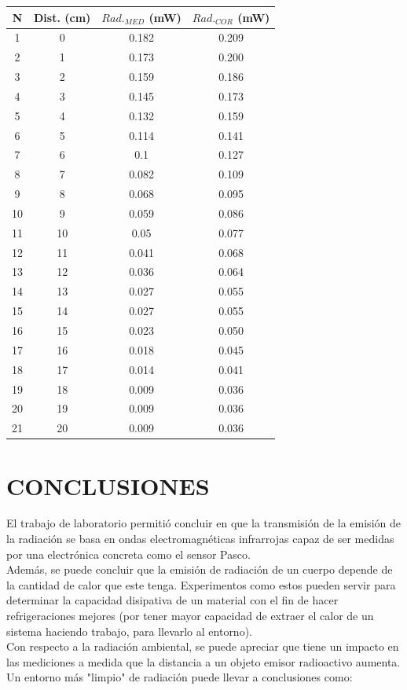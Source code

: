 \documentclass[a4paper]{article}
\begin{document}
		\begin{tabular}{ c  c  c  c }
			\toprule
			N \textdegree & Dist. (cm) & $Rad._{MED}$ (mW) & $Rad._{COR}$ (mW) \\
			\midrule
			1   &   0   & 0.182   & 0.209 \\
			2   &   1   & 0.173   & 0.200 \\
			3   &   2   & 0.159   & 0.186 \\
			4   &   3   & 0.145   & 0.173 \\
			5   &   4   & 0.132   & 0.159 \\
			6   &   5   & 0.114   & 0.141 \\
			7   &   6   & 0.1  	  & 0.127 \\
			8   &   7   & 0.082   & 0.109 \\
			9   &   8   & 0.068   & 0.095 \\
			10  &   9   & 0.059   & 0.086 \\
			11  &   10  & 0.05    & 0.077 \\
			12  &   11  & 0.041   & 0.068 \\
			13  &   12  & 0.036   & 0.064 \\
			14  &   13  & 0.027   & 0.055 \\
			15  &   14  & 0.027   & 0.055 \\
			16  &   15  & 0.023   & 0.050 \\
			17  &   16  & 0.018   & 0.045 \\
			18  &   17  & 0.014   & 0.041 \\
			19  &   18  & 0.009   & 0.036 \\
			20  &   19  & 0.009   & 0.036 \\
			21  &   20  & 0.009   & 0.036 \\
			\bottomrule
		\end{tabular}

	\section{CONCLUSIONES}
		\indent El trabajo de laboratorio permitió concluir en que la transmisión de la emisión de la radiación se basa en ondas electromagnéticas infrarrojas capaz de ser medidas por una electrónica concreta como el sensor Pasco. \\
		\indent Además, se puede concluir que la emisión de radiación de un cuerpo depende de la cantidad de calor que este tenga. Experimentos como estos pueden servir para determinar la capacidad disipativa de un material con el fin de hacer refrigeraciones mejores (por tener mayor capacidad de extraer el calor de un sistema haciendo trabajo, para llevarlo al entorno). \\
		\indent Con respecto a la radiación ambiental, se puede apreciar que tiene un impacto en las mediciones a medida que la distancia a un objeto emisor radioactivo aumenta. Un entorno más "limpio" de radiación puede llevar a conclusiones como: \\
		
\end{document}
